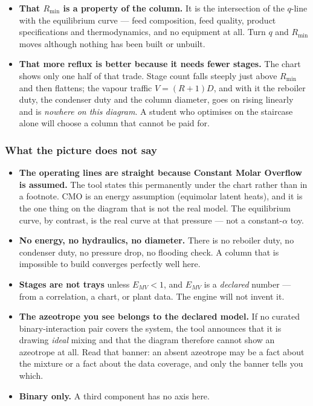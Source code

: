 \documentclass[11pt,a4paper]{article}
\begin{document}
\begin{itemize}[leftmargin=*,nosep,topsep=4pt]
  \item \textbf{That $R_{\min}$ is a property of the column.}  It is the
        intersection of the $q$-line with the equilibrium curve --- feed
        composition, feed quality, product specifications and
        thermodynamics, and no equipment at all.  Turn $q$ and $R_{\min}$
        moves although nothing has been built or unbuilt.
  \item \textbf{That more reflux is better because it needs fewer
        stages.}  The chart shows only one half of that trade.  Stage
        count falls steeply just above $R_{\min}$ and then flattens; the
        vapour traffic $V = (R+1)D$, and with it the reboiler duty, the
        condenser duty and the column diameter, goes on rising linearly
        and is \emph{nowhere on this diagram}.  A student who optimises on
        the staircase alone will choose a column that cannot be paid for.
\end{itemize}

\subsubsection*{What the picture does not say}

\begin{itemize}[leftmargin=*,nosep]
  \item \textbf{The operating lines are straight because Constant Molar
        Overflow is assumed.}  The tool states this permanently under the
        chart rather than in a footnote.  CMO is an energy assumption
        (equimolar latent heats), and it is the one thing on the diagram
        that is not the real model.  The equilibrium curve, by contrast,
        is the real curve at that pressure --- not a constant-$\alpha$ toy.
  \item \textbf{No energy, no hydraulics, no diameter.}  There is no
        reboiler duty, no condenser duty, no pressure drop, no flooding
        check.  A column that is impossible to build converges perfectly
        well here.
  \item \textbf{Stages are not trays} unless $E_{MV} < 1$, and $E_{MV}$
        is a \emph{declared} number --- from a correlation, a chart, or
        plant data.  The engine will not invent it.
  \item \textbf{The azeotrope you see belongs to the declared model.}  If
        no curated binary-interaction pair covers the system, the tool
        announces that it is drawing \emph{ideal} mixing and that the
        diagram therefore cannot show an azeotrope at all.  Read that
        banner: an absent azeotrope may be a fact about the mixture or a
        fact about the data coverage, and only the banner tells you which.
  \item \textbf{Binary only.}  A third component has no axis here.
\end{itemize}
\end{document}
